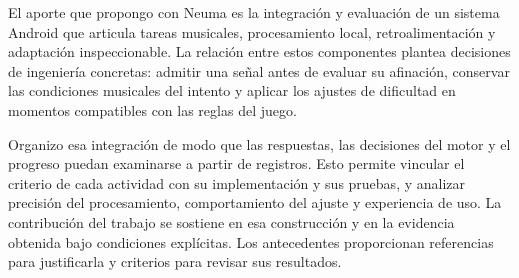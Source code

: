 El aporte que propongo con Neuma es la integración y evaluación de un sistema
Android que articula tareas musicales, procesamiento local, retroalimentación
y adaptación inspeccionable. La relación entre estos componentes plantea
decisiones de ingeniería concretas: admitir una señal antes de evaluar su
afinación, conservar las condiciones musicales del intento y aplicar los ajustes
de dificultad en momentos compatibles con las reglas del juego.

Organizo esa integración de modo que las respuestas, las decisiones del motor
y el progreso puedan examinarse a partir de registros. Esto permite vincular
el criterio de cada actividad con su implementación y sus pruebas, y analizar
precisión del procesamiento, comportamiento del ajuste y experiencia de uso.
La contribución del trabajo se sostiene en esa construcción y en la evidencia
obtenida bajo condiciones explícitas. Los antecedentes proporcionan referencias
para justificarla y criterios para revisar sus resultados.
